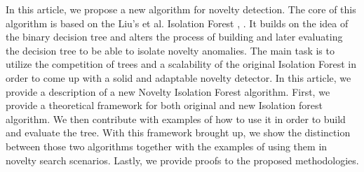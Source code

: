 In this article, we propose a new algorithm for novelty detection.
The core of this algorithm is based on the Liu's et al. Isolation Forest \cite{liu2008isolation}, \cite{liu2012isolation}.
It builds on the idea of the binary decision tree and alters the process of building and later evaluating the decision tree to be able to isolate novelty anomalies.
The main task is to utilize the competition of trees and a scalability of the original Isolation Forest in order to come up with a solid and adaptable novelty detector.
In this article, we provide a description of a new Novelty Isolation Forest algorithm.
First, we provide a theoretical framework for both original and new Isolation forest algorithm.
We then contribute with examples of how to use it in order to build and evaluate the tree.
With this framework brought up, we show the distinction between those two algorithms together with the examples of using them in novelty search scenarios.
Lastly, we provide proofs to the proposed methodologies.


